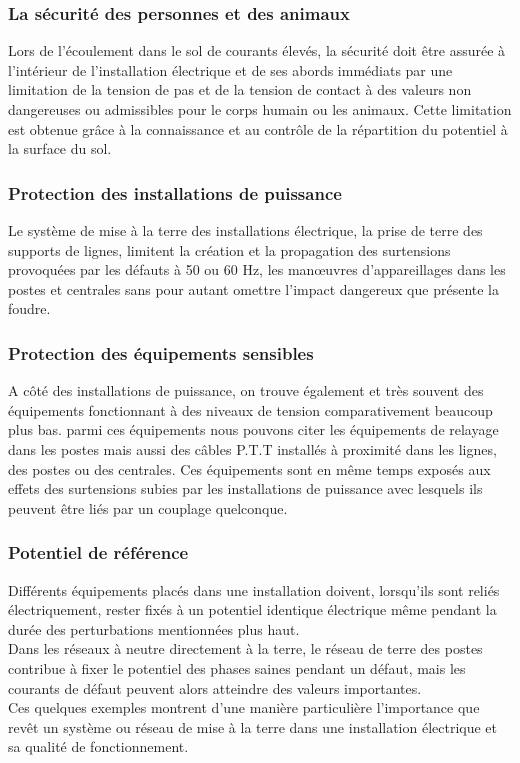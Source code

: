				\subsubsection{La sécurité des personnes et des animaux}
					Lors de l'écoulement dans le sol de courants élevés, la sécurité doit être assurée à l'intérieur de l'installation électrique et de ses abords immédiats par une limitation de la tension de pas et de la tension de contact à des valeurs non dangereuses ou admissibles pour le corps humain ou les animaux. Cette limitation est obtenue grâce à la connaissance et au contrôle de la répartition du potentiel à la surface du sol.
					
				\subsubsection{Protection des installations de puissance}
					Le système de mise à la terre des installations électrique, la prise de terre des supports de lignes, limitent la création et la propagation des surtensions provoquées par les défauts à 50 ou 60 Hz, les manœuvres d'appareillages dans les postes et centrales sans pour autant omettre l'impact dangereux que présente la foudre.
					
				\subsubsection{Protection des équipements sensibles}
					A côté des installations de puissance, on trouve également et très souvent des équipements fonctionnant à des niveaux de tension comparativement beaucoup plus bas. parmi ces équipements nous pouvons citer les équipements de relayage dans les postes mais aussi des câbles P.T.T installés à proximité dans les lignes, des postes ou des centrales. Ces équipements sont en même temps exposés aux effets des surtensions subies par les installations de puissance avec lesquels ils peuvent être liés par un couplage quelconque.
					
				\subsubsection{Potentiel de référence}
					Différents équipements placés dans une installation doivent, lorsqu'ils sont reliés électriquement, rester fixés à un potentiel identique électrique même pendant la durée des perturbations mentionnées plus haut.\\							
Dans les réseaux à neutre directement à la terre, le réseau de terre des postes contribue à fixer le potentiel des phases saines pendant un défaut, mais les courants de défaut peuvent alors atteindre des valeurs importantes.\\
Ces quelques exemples montrent d'une manière particulière l'importance que revêt un système ou réseau de mise à la terre dans une installation électrique et sa qualité de fonctionnement.

